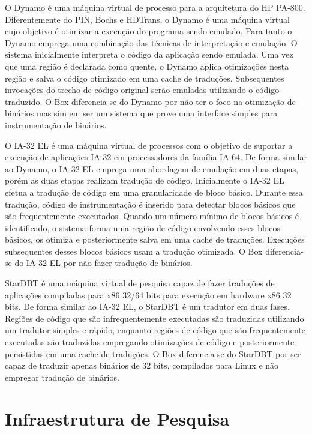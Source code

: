\documentclass[11pt,twoside]{article}
\begin{document}
O Dynamo \cite{Bala2000} é uma máquina virtual de processo para a arquitetura do HP PA-800. 
Diferentemente do PIN, Bochs e HDTrans, o Dynamo é uma máquina virtual cujo objetivo é otimizar a execução do programa sendo emulado.
Para tanto o Dynamo emprega uma combinação das técnicas de interpretação e emulação. 
O sistema inicialmente interpreta o código da aplicação sendo emulada. 
Uma vez que uma região é declarada como quente, o Dynamo aplica otimizações nesta região e salva o código otimizado em uma cache de traduções. 
Subsequentes invocações do trecho de código original serão emuladas utilizando o código traduzido. 
O Box diferencia-se do Dynamo por não ter o foco na otimização de binários mas sim em ser um sistema que prove uma interface simples para 
instrumentação de binários.

O IA-32 EL \cite{Baraz2003} é uma máquina virtual de processos com o objetivo de suportar a execução de aplicações IA-32 em processadores da família IA-64.
De forma similar ao Dynamo, o IA-32 EL emprega uma abordagem de emulação em duas etapas, porém as duas etapas realizam tradução de código. 
Inicialmente o IA-32 EL efetua a tradução de código em uma granularidade de bloco básico.
Durante essa tradução, código de instrumentação é inserido para detectar blocos básicos que são frequentemente executados. 
Quando um número mínimo de blocos básicos é identificado, o sistema forma uma região de código envolvendo esses blocos básicos, os otimiza e posteriormente salva em uma cache de traduções. 
Execuções subsequentes desses blocos básicos usam a tradução otimizada. 
O Box diferencia-se do IA-32 EL por não fazer tradução de binários.

StarDBT \cite{Wang2007} é uma máquina virtual de pesquisa capaz de fazer traduções de aplicações compiladas para x86 32/64 bits para execução em hardware x86 32 bits.
De forma similar ao IA-32 EL, o StarDBT é um tradutor em duas fases. 
Regiões de código que são infrequentemente executadas são traduzidas utilizando um tradutor simples e rápido, enquanto regiões de código que são frequentemente executadas são traduzidas empregando otimizações de código e posteriormente persistidas em uma cache de traduções. 
O Box diferencia-se do StarDBT por ser capaz de traduzir apenas binários de 32 bits, compilados para Linux e não empregar tradução de binários.


\section{Infraestrutura de Pesquisa}
\end{document}
